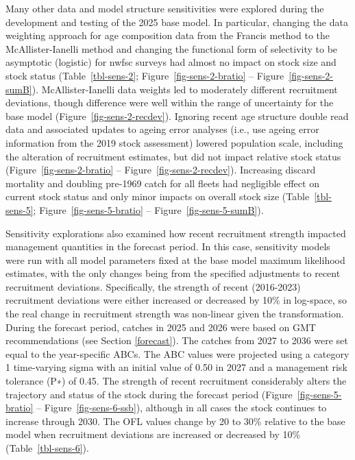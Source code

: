 \documentclass[
  english,
]{article}
\begin{document}
Many other data and model structure sensitivities were explored during
the development and testing of the 2025 base model. In particular,
changing the data weighting approach for age composition data from the
Francis method to the McAllister-Ianelli method and changing the
functional form of selectivity to be asymptotic (logistic) for
\gls{nwfsc} surveys had almost no impact on stock size and stock status
(Table~\ref{tbl-sens-2}; Figure~\ref{fig-sens-2-bratio} --
Figure~\ref{fig-sens-2-sumB}). McAllister-Ianelli data weights led to
moderately different recruitment deviations, though difference were well
within the range of uncertainty for the base model
(Figure~\ref{fig-sens-2-recdev}). Ignoring recent age structure double
read data and associated updates to ageing error analyses (i.e., use
ageing error information from the 2019 stock assessment) lowered
population scale, including the alteration of recruitment estimates, but
did not impact relative stock status (Figure~\ref{fig-sens-2-bratio} --
Figure~\ref{fig-sens-2-recdev}). Increasing discard mortality and
doubling pre-1969 catch for all fleets had negligible effect on current
stock status and only minor impacts on overall stock size
(Table~\ref{tbl-sens-5}; Figure~\ref{fig-sens-5-bratio} --
Figure~\ref{fig-sens-5-sumB}).

Sensitivity explorations also examined how recent recruitment strength
impacted management quantities in the forecast period. In this case,
sensitivity models were run with all model parameters fixed at the base
model maximum likelihood estimates, with the only changes being from the
specified adjustments to recent recruitment deviations. Specifically,
the strength of recent (2016-2023) recruitment deviations were either
increased or decreased by 10\% in log-space, so the real change in
recruitment strength was non-linear given the transformation. During the
forecast period, catches in 2025 and 2026 were based on GMT
recommendations (see Section \ref{forecast}). The catches from 2027 to
2036 were set equal to the year-specific ABCs. The ABC values were
projected using a category 1 time-varying sigma with an initial value of
0.50 in 2027 and a management risk tolerance (P∗) of 0.45. The strength
of recent recruitment considerably alters the trajectory and status of
the stock during the forecast period (Figure~\ref{fig-sens-5-bratio} --
Figure~\ref{fig-sens-6-ssb}), although in all cases the stock continues
to increase through 2030. The OFL values change by 20 to 30\% relative
to the base model when recruitment deviations are increased or decreased
by 10\% (Table~\ref{tbl-sens-6}).
\end{document}
